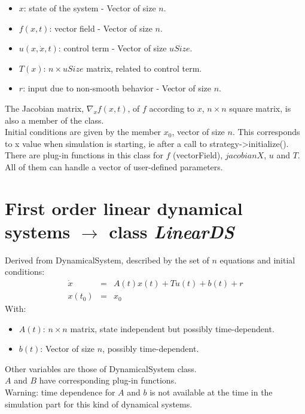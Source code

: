 \documentclass[10pt]{report}
\begin{document}
\begin{itemize}
\item $x$: state of the system - Vector of size $n$.
\item $f(x,t)$: vector field - Vector of size $n$.
\item $u(x, \dot x, t)$: control term - Vector of size $uSize$.
\item $T(x)$: $n\times uSize$ matrix, related to control term.
\item $r$: input due to non-smooth behavior - Vector of size $n$.
\end{itemize}

The Jacobian matrix, $\nabla_x f(x,t)$, of $f$ according to $x$, $n\times n$ square matrix, is also a member of the class. \\

Initial conditions are given by the member $x_0$, vector of size $n$. This corresponds to x value when
simulation is starting, ie after a call to strategy->initialize(). \\

There are plug-in functions in this class for $f$ (vectorField), $jacobianX$, $u$ and $T$. All
of them can handle a vector of user-defined parameters. 

\section{First order linear dynamical systems $\rightarrow$ class \it{LinearDS}}

Derived from DynamicalSystem, described by the set of $n$ equations and initial conditions: 
\begin{eqnarray}
  \dot x &=& A(t)x(t)+Tu(t)+b(t)+r \\
  x(t_0)&=&x_0 
\end{eqnarray}
With:
\begin{itemize}
\item $A(t)$: $n\times n$ matrix, state independent but possibly time-dependent.
\item $b(t)$: Vector of size $n$, possibly time-dependent.
\end{itemize}
Other variables are those of DynamicalSystem class. \\
$A$ and $B$ have corresponding plug-in functions. \\

Warning: time dependence for $A$ and $b$ is not available at the time in the simulation part for this kind of dynamical systems. \\
\end{document}
